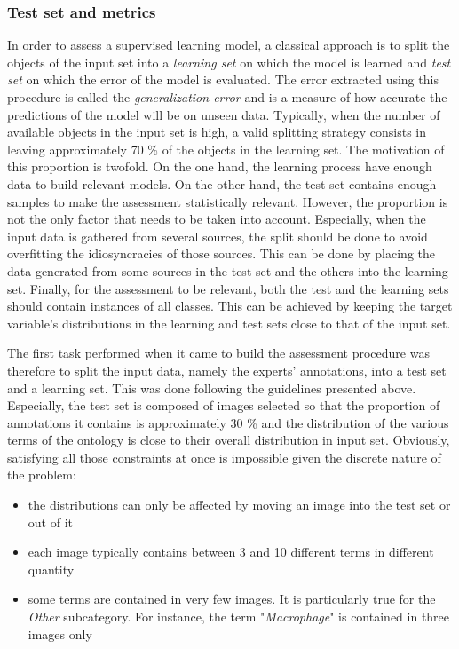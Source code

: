 \subsubsection{Test set and metrics}
\label{sssec:thyroid_test_set}
In order to assess a supervised learning model, a classical approach is to split the objects of the input set into a \textit{learning set} on which the model is learned and \textit{test set} on which the error of the model is evaluated. The error extracted using this procedure is called the \textit{generalization error} and is a measure of how accurate the predictions of the model will be on unseen data. Typically, when the number of available objects in the input set is high, a valid splitting strategy consists in leaving approximately 70 \% of the objects in the learning set. The motivation of this proportion is twofold. On the one hand, the learning process have enough data to build relevant models. On the other hand, the test set contains enough samples to make the assessment statistically relevant. However, the proportion is not the only factor that needs to be taken into account. Especially, when the input data is gathered from several sources, the split should be done to avoid overfitting the idiosyncracies of those sources. This can be done by placing the data generated from some sources in the test set and the others into the learning set. Finally, for the assessment to be relevant, both the test and the learning sets should contain instances of all classes. This can be achieved by keeping the target variable's distributions in the learning and test sets close to that of the input set.

The first task performed when it came to build the assessment procedure was therefore to split the input data, namely the experts' annotations, into a test set and a learning set. This was done following the guidelines presented above. Especially, the test set is composed of images selected so that the proportion of annotations it contains is approximately 30 \% and the distribution of the various terms of the ontology is close to their overall distribution in input set. Obviously, satisfying all those constraints at once is impossible given the discrete nature of the problem:

\begin{itemize}
	\item the distributions can only be affected by moving an image into the test set or out of it
	\item each image typically contains between 3 and 10 different terms in different quantity
	\item some terms are contained in very few images. It is particularly true for the \textit{Other} subcategory. For instance, the term "\textit{Macrophage}" is contained in three images only
\end{itemize}

